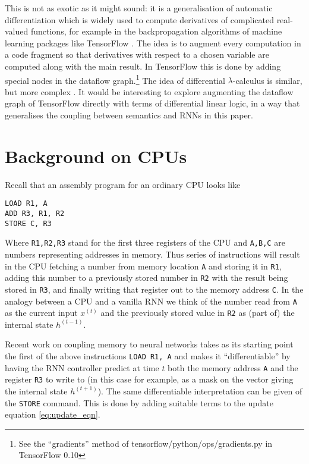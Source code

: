 \documentclass[english,letter paper,12pt,leqno]{article}
\theoremstyle{example}
\numberwithin{equation}{section}
\begin{document}
This is not as exotic as it might sound: it is a generalisation of automatic differentiation \cite{griewank} which is widely used to compute derivatives of complicated real-valued functions, for example in the backpropagation algorithms of machine learning packages like TensorFlow \cite[\S 4.1]{tensorflow}. The idea is to augment every computation in a code fragment so that derivatives with respect to a chosen variable are computed along with the main result. In TensorFlow this is done by adding special nodes in the dataflow graph.\footnote{See the ``gradients'' method of tensorflow/python/ops/gradients.py in TensorFlow 0.10} The idea of differential $\lambda$-calculus is similar, but more complex \cite{manzyuk}. It would be interesting to explore augmenting the dataflow graph of TensorFlow directly with terms of differential linear logic, in a way that generalises the coupling between semantics and RNNs in this paper.

\appendix

\section{Background on CPUs}\label{section:appendix_cpu}

Recall that an assembly program for an ordinary CPU looks like
\begin{verbatim}
LOAD R1, A
ADD R3, R1, R2
STORE C, R3
\end{verbatim}
Where \verb+R1,R2,R3+ stand for the first three registers of the CPU and \verb+A,B,C+ are numbers representing addresses in memory. Thus series of instructions will result in the CPU fetching a number from memory location \verb+A+ and storing it in \verb+R1+, adding this number to a previously stored number in \verb+R2+ with the result being stored in \verb+R3+, and finally writing that register out to the memory address \verb+C+. In the analogy between a CPU and a vanilla RNN we think of the number read from \verb+A+ as the current input $x^{(t)}$ and the previously stored value in \verb+R2+ as (part of) the internal state $h^{(t-1)}$.

Recent work \cite{??,??} on coupling memory to neural networks takes as its starting point the first of the above instructions \verb+LOAD R1, A+ and makes it ``differentiable'' by having the RNN controller predict at time $t$ both the memory address \verb+A+ and the register \verb+R3+ to write to (in this case for example, as a mask on the vector giving the internal state $h^{(t+1)}$). The same differentiable interpretation can be given of the \verb+STORE+ command. This is done by adding suitable terms to the update equation \eqref{eq:update_eqn}.
\end{document}
